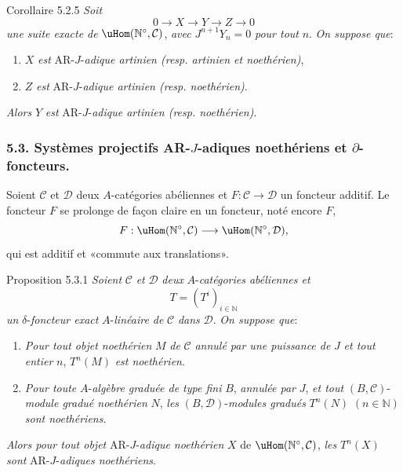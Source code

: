 \begin{statement}{Corollaire 5.2.5}
\emph{Soit}
\[
0\longrightarrow X\longrightarrow Y\longrightarrow Z\longrightarrow0
\]
\emph{une suite exacte de} \(\uHom(\mathbb{N}^\circ,\mathcal{C})\), \emph{avec} \(J^{n+1}Y_n=0\) \emph{pour tout} \(n\). \emph{On suppose que}:
\begin{enumerate}[label=\textup{(\roman*)}]
\item \(X\) \emph{est} AR-\(J\)-\emph{adique artinien (resp. artinien et noethérien)},
\item \(Z\) \emph{est} AR-\(J\)-\emph{adique artinien (resp. noethérien)}.
\end{enumerate}
\emph{Alors} \(Y\) \emph{est} AR-\(J\)-\emph{adique artinien (resp. noethérien)}.
\end{statement}

\subsubsection*{5.3. Systèmes projectifs AR-\(J\)-adiques noethériens et \(\partial\)-foncteurs.}

Soient \(\mathcal{C}\) et \(\mathcal{D}\) deux \(A\)-catégories abéliennes et \(F:\mathcal{C}\to\mathcal{D}\) un foncteur additif. Le foncteur \(F\) se prolonge de façon claire en un foncteur, noté encore \(F\),
\[
F:\uHom(\mathbb{N}^\circ,\mathcal{C})\longrightarrow\uHom(\mathbb{N}^\circ,\mathcal{D}),
\]
qui est additif et «commute aux translations».

\begin{statement}{Proposition 5.3.1}
\emph{Soient} \(\mathcal{C}\) \emph{et} \(\mathcal{D}\) \emph{deux} \(A\)-\emph{catégories abéliennes et}
\[
T=(T^i)_{i\in\mathbb{N}}
\]
\emph{un} \(\delta\)-\emph{foncteur exact} \(A\)-\emph{linéaire de} \(\mathcal{C}\) \emph{dans} \(\mathcal{D}\). \emph{On suppose que}:
\begin{enumerate}[label=\textup{(\roman*)}]
\item \emph{Pour tout objet noethérien} \(M\) \emph{de} \(\mathcal{C}\) \emph{annulé par une puissance de} \(J\) \emph{et tout entier} \(n\), \(T^n(M)\) \emph{est noethérien}.
\item \emph{Pour toute} \(A\)-\emph{algèbre graduée de type fini} \(B\), \emph{annulée par} \(J\), \emph{et tout} \((B,\mathcal{C})\)-\emph{module gradué noethérien} \(N\), \emph{les} \((B,\mathcal{D})\)-\emph{modules gradués} \(T^n(N)\) \((n\in\mathbb{N})\) \emph{sont noethériens}.
\end{enumerate}
\emph{Alors pour tout objet} AR-\(J\)-\emph{adique noethérien} \(X\) de \(\uHom(\mathbb{N}^\circ,\mathcal{C})\), \emph{les} \(T^n(X)\) \emph{sont} AR-\(J\)-\emph{adiques noethériens}.
\end{statement}

